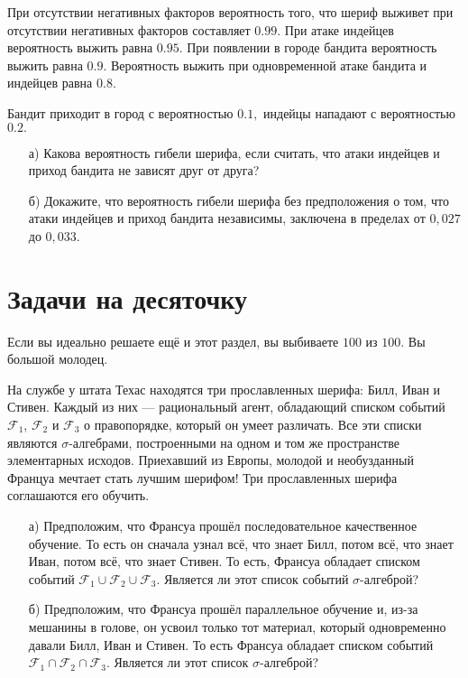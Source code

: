 \documentclass[12pt, a4paper, oneside]{article}
\begin{document}
\begin{problem}{5}
    При отсутствии негативных факторов вероятность того, что шериф выживет при отсутствии негативных факторов составляет $0.99.$ При атаке индейцев вероятность выжить равна $0.95$. При появлении в городе бандита вероятность выжить равна $0.9$. Вероятность выжить при одновременной атаке бандита и индейцев равна $0.8$. 

    Бандит приходит в город с вероятностью $0.1,$ индейцы нападают с вероятностью $0.2.$
	
    \begin{enumerate}
        \item[а)]  Какова вероятность гибели шерифа, если считать, что атаки индейцев и приход бандита не зависят друг от друга?
        \item[б)]  Докажите, что вероятность гибели шерифа без предположения о том, что атаки индейцев и приход бандита независимы, заключена в пределах от $0,027$ до $0,033$.
    \end{enumerate} 
\end{problem}

\section*{Задачи на десяточку}

Если вы идеально решаете ещё и этот раздел, вы выбиваете $100$ из $100$. Вы большой молодец. 

\begin{problem}{5}
    На службе у штата Техас находятся три прославленных шерифа: Билл, Иван и Стивен. Каждый из них --- рациональный агент, обладающий списком событий $\mathcal{F}_1$, $\mathcal{F}_2$ и $\mathcal{F}_3$ о правопорядке, который он умеет различать. Все эти списки являются $\sigma$-алгебрами, построенными на одном и том же пространстве элементарных исходов. Приехавший из Европы, молодой и необузданный Француа мечтает стать лучшим шерифом! Три прославленных шерифа соглашаются его обучить. 
    \begin{enumerate}
        \item[а)] Предположим, что Франсуа прошёл последовательное качественное обучение. То есть он сначала узнал всё, что знает Билл, потом всё, что знает Иван, потом всё, что знает Стивен. То есть, Франсуа обладает списком событий $\mathcal{F}_1 \cup \mathcal{F}_2 \cup \mathcal{F}_3$. Является ли этот список событий $\sigma$-алгеброй? 
        
        \item[б)] Предположим, что Франсуа прошёл параллельное обучение и, из-за мешанины в голове, он усвоил только тот материал, который одновременно давали Билл, Иван и Стивен. То есть Франсуа обладает списком событий $\mathcal{F}_1 \cap \mathcal{F}_2 \cap \mathcal{F}_3$. Является ли этот список $\sigma$-алгеброй? 
    \end{enumerate} 
\end{problem}
\end{document}
